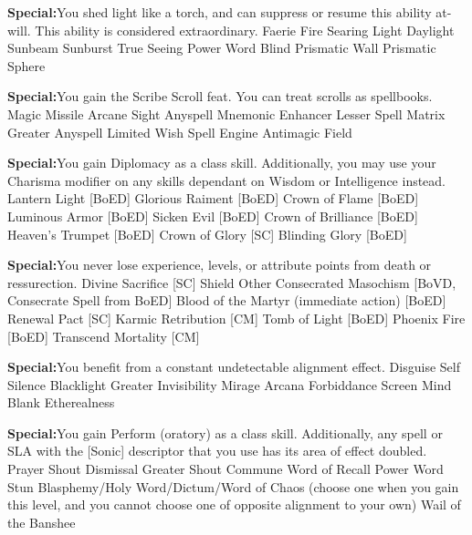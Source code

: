 \textbf{Special:}{You shed light like a torch, and can suppress or resume this ability at-will. This ability is considered extraordinary.}
\sphere
{Faerie Fire}
{Searing Light}
{Daylight}
{Sunbeam}
{Sunburst}
{True Seeing}
{Power Word Blind}
{Prismatic Wall}
{Prismatic Sphere}

\textbf{Special:}{You gain the Scribe Scroll feat. You can treat scrolls as spellbooks.}
\sphere
{Magic Missile}
{Arcane Sight}
{Anyspell}
{Mnemonic Enhancer}
{Lesser Spell Matrix}
{Greater Anyspell}
{Limited Wish}
{Spell Engine}
{Antimagic Field}

\textbf{Special:}{You gain Diplomacy as a class skill. Additionally, you may use your Charisma modifier on any skills dependant on Wisdom or Intelligence instead.}
\sphere
{Lantern Light [BoED]}
{Glorious Raiment [BoED]}
{Crown of Flame [BoED]}
{Luminous Armor [BoED]}
{Sicken Evil [BoED]}
{Crown of Brilliance [BoED] }
{Heaven's Trumpet [BoED]}
{Crown of Glory [SC]}
{Blinding Glory [BoED]}

\textbf{Special:}{You never lose experience, levels, or attribute points from death or ressurection.}
\sphere
{Divine Sacrifice [SC]}
{Shield Other}
{Consecrated Masochism [BoVD, Consecrate Spell from BoED]}
{Blood of the Martyr (immediate action) [BoED]}
{Renewal Pact [SC]}
{Karmic Retribution [CM]}
{Tomb of Light [BoED]}
{Phoenix Fire [BoED]}
{Transcend Mortality [CM]}

\textbf{Special:}{You benefit from a constant undetectable alignment effect.}
\sphere
{Disguise Self}
{Silence}
{Blacklight}
{Greater Invisibility}
{Mirage Arcana}
{Forbiddance}
{Screen}
{Mind Blank}
{Etherealness}

\textbf{Special:}{You gain Perform (oratory) as a class skill. Additionally, any spell or SLA with the [Sonic] descriptor that you use has its area of effect doubled.}
\sphere
{Prayer}
{Shout}
{Dismissal}
{Greater Shout}
{Commune}
{Word of Recall}
{Power Word Stun}
{Blasphemy/Holy Word/Dictum/Word of Chaos (choose one when you gain this level, and you cannot choose one of opposite alignment to your own)}
{Wail of the Banshee}

